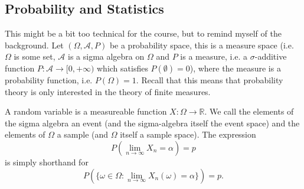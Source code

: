 \documentclass{article}
\begin{document}
\subsection{Probability and Statistics}
This might be a bit too technical for the course, but to remind myself of the background. Let $(\Omega, \mathcal{A}, P)$ be a probability space, this is a measure space (i.e. $\Omega$ is some set, $\mathcal{A}$ is a sigma algebra on $\Omega$ and $P$ is a measure, i.e. a $\sigma$-additive function $P : \mathcal{A} \rightarrow [0, +\infty)$ which satisfies $P(\emptyset) = 0$), where the measure is a probability function, i.e. $P(\Omega) = 1$. Recall that this means that probability theory is only interested in the theory of finite measures.

A random variable is a measureable function $X : \Omega \rightarrow \mathbb{R}$. We call the elements of the sigma algebra an event (and the sigma-algebra itself the event space) and the elements of $\Omega$ a sample (and $\Omega$ itself a sample space). The expression
$$
P\left(\lim_{n \rightarrow \infty} X_n = \alpha\right) = p
$$
is simply shorthand for
$$
P\left(\{\omega \in \Omega : \lim_{n \rightarrow \infty} X_n(\omega) = \alpha\}\right) = p.
$$
\end{document}
